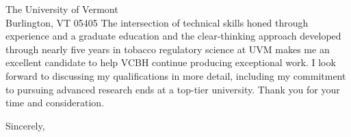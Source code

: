 \documentclass[]{letter}
\begin{document}
\begin{letter}{The University of Vermont \\ Burlington, VT 05405}
The intersection of technical skills honed through experience and a graduate education and the clear-thinking approach developed through nearly five years in tobacco regulatory science at UVM makes me an excellent candidate to help VCBH continue producing exceptional work. I look forward to discussing my qualifications in more detail, including my commitment to pursuing advanced research ends at a top-tier university. Thank you for your time and consideration.


\signature{Anthony J. Barrows}

\closing{Sincerely,}


\end{letter}
\end{document}
